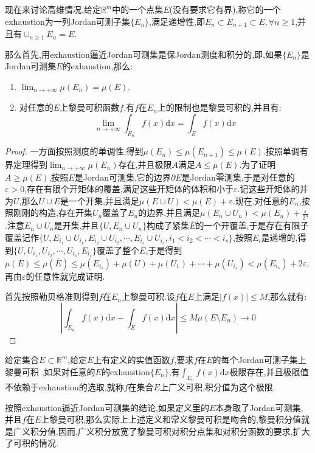 现在来讨论高维情况.给定$\mathbb{R}^m$中的一个点集$E$(没有要求它有界),称它的一个exhaustion为一列Jordan可测子集$\{E_n\}$,满足递增性,即$E_n\subset E_{n+1}\subset E,\forall n\ge1$,并且有$\cup_{n\ge1}E_n=E$.

那么首先,用exhaustion逼近Jordan可测集是保Jordan测度和积分的,即,如果$\{E_n\}$是Jordan可测集$E$的exhaustion,那么:
\begin{enumerate}
	\item $\lim_{n\to+\infty}\mu(E_n)=\mu(E)$.
	\item 对任意的$E$上黎曼可积函数$f$,有$f$在$E_n$上的限制也是黎曼可积的,并且有:
	$$\lim_{n\to+\infty}\int_{E_n}f(x)\mathrm{d}x=\int_Ef(x)\mathrm{d}x$$
\end{enumerate}
\begin{proof}
	
	一方面按照测度的单调性,得到$\mu(E_n)\le\mu(E_{n+1})\le\mu(E)$.按照单调有界定理得到$\lim_{n\to+\infty}\mu(E_n)$存在,并且极限$A$满足$A\le\mu(E)$.为了证明$A\ge\mu(E)$,按照$E$是Jordan可测集,它的边界$\partial E$是Jordan零测集,于是对任意的$\varepsilon>0$,存在有限个开矩体的覆盖,满足这些开矩体的体积和小于$\varepsilon$.记这些开矩体的并为$U$,那么$U\cup E$是一个开集,并且满足$\mu(E\cup U)<\mu(E)+\varepsilon$.现在,对任意的$E_n$,按照刚刚的构造,存在开集$U_n$覆盖了$E_n$的边界,并且满足$\mu(E_n\cup U_n)<\mu(E_n)+\frac{\varepsilon}{2^n}$.注意$E_n\cup U_n$是开集,并且$\{U,E_n\cup U_n\}$构成了紧集$\overline{E}$的一个开覆盖,于是存在有限子覆盖记作$\{U,E_{i_1}\cup U_{i_1},E_{i_2}\cup U_{i_2},\cdots,E_{i_s}\cup U_{i_s},i_1<i_2<\cdots<i_s\}$,按照$E_i$是递增的,得到$\{U,U_{i_1},U_{i_2},\cdots,U_{i_s},E_{i_s}\}$覆盖了整个$\overline{E}$,于是得到$\mu(E)\le\mu(\overline{E})\le\mu(E_{i_s})+\mu(U)+\mu(U_1)+\cdots+\mu(U_{i_s})<\mu(E_{i_s})+2\varepsilon$.再由$\varepsilon$的任意性就完成证明.
	
	首先按照勒贝格准则得到$f$在$E_n$上黎曼可积.设$f$在$E$上满足$|f(x)|\le M$,那么就有:
	$$\left|\int_ {E_n}f(x)\mathrm{d}x-\int_Ef(x)\mathrm{d}x\right|\le M\mu(E\setminus E_n)\to0$$
	
\end{proof}

给定集合$E\subset\mathbb{R}^m$,给定$E$上有定义的实值函数$f$,要求$f$在$E$的每个Jordan可测子集上黎曼可积 ,如果对任意的$E$的exhaustion$\{E_n\}$,有$\int_{E_n}f(x)\mathrm{d}x$极限存在,并且极限值不依赖于exhaustion的选取,就称$f$在集合$E$上广义可积,积分值为这个极限.

按照exhaustion逼近Jordan可测集的结论,如果定义里的$E$本身取了Jordan可测集,并且$f$在$E$上黎曼可积,那么实际上上述定义和常义黎曼可积是吻合的,黎曼积分值就是广义积分值.因而,广义积分放宽了黎曼可积对积分点集和对积分函数的要求,扩大了可积的情况.


